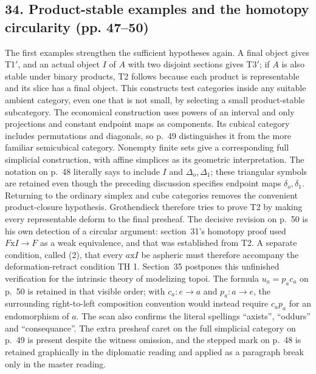 \subsection*{34. Product-stable examples and the homotopy circularity (pp. 47--50)}
The first examples strengthen the sufficient hypotheses again. A final object gives T1$'$, and an actual object $I$ of $A$ with two disjoint sections gives T3$'$; if $A$ is also stable under binary products, T2 follows because each product is representable and its slice has a final object. This constructs test categories inside any suitable ambient category, even one that is not small, by selecting a small product-stable subcategory. The economical construction uses powers of an interval and only projections and constant endpoint maps as components. Its cubical category includes permutations and diagonals, so p.~49 distinguishes it from the more familiar semicubical category. Nonempty finite sets give a corresponding full simplicial construction, with affine simplices as its geometric interpretation. The notation on p.~48 literally says to include $I$ and $\Delta_o,\Delta_1$; these triangular symbols are retained even though the preceding discussion specifies endpoint maps $\delta_o,\delta_1$. Returning to the ordinary simplex and cube categories removes the convenient product-closure hypothesis. Grothendieck therefore tries to prove T2 by making every representable deform to the final presheaf. The decisive revision on p.~50 is his own detection of a circular argument: section~31's homotopy proof used $F\mathrm{x}I\to F$ as a weak equivalence, and that was established from T2. A separate condition, called (2), that every $a\mathrm{x}I$ be aspheric must therefore accompany the deformation-retract condition TH 1. Section~35 postpones this unfinished verification for the intrinsic theory of modelizing topoi. The formula $u_a=p_a c_a$ on p.~50 is retained in that visible order; with $c_a:e\to a$ and $p_a:a\to e$, the surrounding right-to-left composition convention would instead require $c_a p_a$ for an endomorphism of $a$. The scan also confirms the literal spellings ``axists'', ``oddurs'' and ``consequance''. The extra presheaf caret on the full simplicial category on p.~49 is present despite the witness omission, and the stepped mark on p.~48 is retained graphically in the diplomatic reading and applied as a paragraph break only in the master reading.
